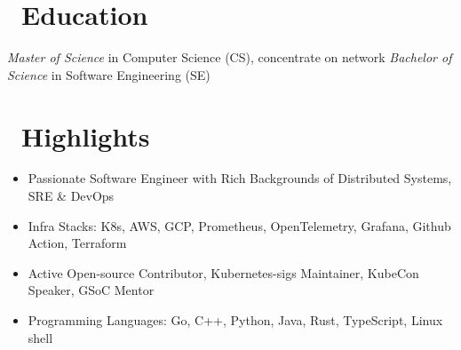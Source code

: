 \documentclass{resume}
\begin{document}





\section{\faGraduationCap\ Education}
\textit{Master of Science} in Computer Science (CS), concentrate on network
\textit{Bachelor of Science} in Software Engineering (SE)

\section{\faCogs\ Highlights}
\begin{itemize}[parsep=0.5ex]
  \item Passionate Software Engineer with Rich Backgrounds of Distributed Systems, SRE \& DevOps
  \item Infra Stacks: K8s, AWS, GCP, Prometheus, OpenTelemetry, Grafana, Github Action, Terraform
  \item Active Open-source Contributor, Kubernetes-sigs Maintainer, KubeCon Speaker, GSoC Mentor
  \item Programming Languages: Go, C++, Python, Java, Rust, TypeScript, Linux shell
\end{itemize}
\end{document}
